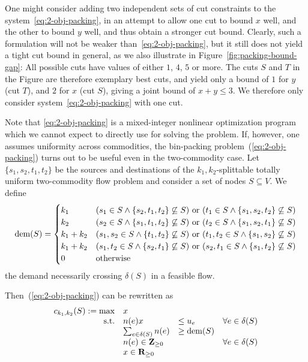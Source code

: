 One might consider adding two independent sets of cut constraints to
the system~\eqref{eq:2-obj-packing}, in an attempt to allow one cut to
bound $x$ well, and the other to bound $y$ well, and thus obtain a
stronger cut bound. Clearly, such a formulation will not be weaker
than~\eqref{eq:2-obj-packing}, but it still does not yield a tight cut
bound in general, as we also illustrate in
Figure~\ref{fig:packing-bound-gap}: All possible cuts have values of
either $1$, $4$, $5$ or more. The cuts $S$ and $T$ in the Figure are
therefore exemplary best cuts, and yield only a bound of $1$ for $y$
(cut $T$), and $2$ for $x$ (cut $S$), giving a joint bound of $x+y\leq
3$. We therefore only consider system~\eqref{eq:2-obj-packing} with
one cut.

Note that \eqref{eq:2-obj-packing} is a mixed-integer nonlinear optimization
program which we cannot expect to directly use for solving the problem.
If, however, one assumes uniformity across commodities, the
bin-packing problem~(\ref{eq:2-obj-packing}) turns out to be useful
even in the two-commodity case. Let $\{s_1,s_2,t_1,t_2\}$ be the
sources and destinations of the $k_1,k_2$-splittable totally uniform
two-commodity flow problem and consider a set of nodes $S\subseteq V$.
We define 
\begin{equation}
  \label{eq:dem}
  \operatorname{dem}(S)= \begin{cases}
    k_1     & (s_1\in S \land \{s_2,t_1,t_2\}\not\subseteq S)\text{ or }
    (t_1\in S \land \{s_1,s_2,t_2\}\not\subseteq S)\\
    k_2     & (s_2\in S \land \{s_1,t_1,t_2\}\not\subseteq S)\text{ or }
    (t_2\in S \land \{s_1,s_2,t_1\}\not\subseteq S)\\
    k_1+k_2 & (s_1,s_2\in S \land \{t_1,t_2\}\not\subseteq S)\text{ or }
    (t_1,t_2\in S \land \{s_1,s_2\}\not\subseteq S)\\
    k_1+k_2 & (s_1,t_2\in S \land \{s_2,t_1\}\not\subseteq S)\text{ or }
    (s_2,t_1\in S \land \{s_1,t_2\}\not\subseteq S)\\
    0       & \text{otherwise}
  \end{cases}
\end{equation}
the demand necessarily crossing  $\delta(S)$ in a feasible flow.

Then~(\ref{eq:2-obj-packing}) can be rewritten as
\begin{equation}
  \label{eq:2-obj-tu-packing}
  \begin{array}{rlll}
    c_{k_1,k_2}(S):=\max& x\\
    \text{s.t.}&n(e)x&\leq u_e&\forall e\in\delta(S)\\
               &\sum_{e\in\delta(S)}n(e)& \geq \operatorname{dem}(S)&\\
               &n(e)\in\mathbf{Z}_{\geq0}&&\forall e\in\delta(S)\\
               &x\in\mathbf{R}_{\geq0}               
  \end{array}
\end{equation}


